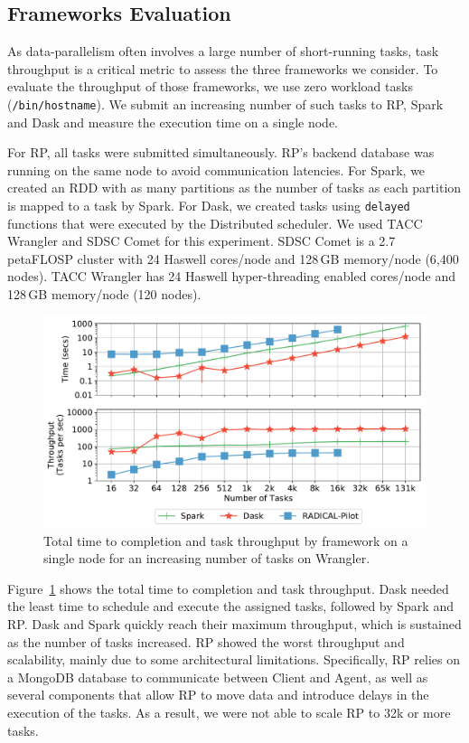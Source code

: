 \subsection{Frameworks Evaluation}
\label{sec:framework_eval}

As data-parallelism often involves a large number of short-running tasks, task
throughput is a critical metric to assess the three frameworks we consider. To
evaluate the throughput of those frameworks, we use zero workload tasks
(\texttt{/bin/hostname}). We submit an increasing number of such tasks to
RP, Spark and Dask and measure the execution time on a single node.

For RP, all tasks were submitted simultaneously. RP's
backend database was running on the same node to avoid communication
latencies. For Spark, we created an RDD with as many partitions as the number of
tasks as each partition is mapped to a task by Spark. For Dask, we created tasks
using \texttt{delayed} functions that were executed by the Distributed
scheduler. We used TACC Wrangler and SDSC Comet for this experiment. SDSC Comet
is a 2.7 petaFLOSP cluster with 24 Haswell cores/node and 128\,GB memory/node
(6,400 nodes). TACC Wrangler has 24 Haswell hyper-threading enabled cores/node
and 128\,GB memory/node (120 nodes).

\begin{figure}[t]
    \centering
    \includegraphics[width=.75\textwidth]{figures/data_analytics_hpc/task_par/dask_spark_rp_wrangler.pdf}
    \caption{Total time to completion and task throughput by framework on a
    single node for an increasing number of tasks on Wrangler.}
    \label{fig:dask_spark_rp_wrangler}
\end{figure}

Figure~\ref{fig:dask_spark_rp_wrangler} shows the total time to completion and
task throughput. Dask needed the least time to schedule and execute the assigned
tasks, followed by Spark and RP. Dask and Spark quickly reach their
maximum throughput, which is sustained as the number of tasks increased.
RP showed the worst throughput and scalability, mainly due to some
architectural limitations. Specifically, RP relies on a MongoDB
database to communicate between Client and Agent, as well as several components
that allow RP to move data and introduce delays in the execution of
the tasks. As a result, we were not able to scale RP to 32k or more
tasks.

